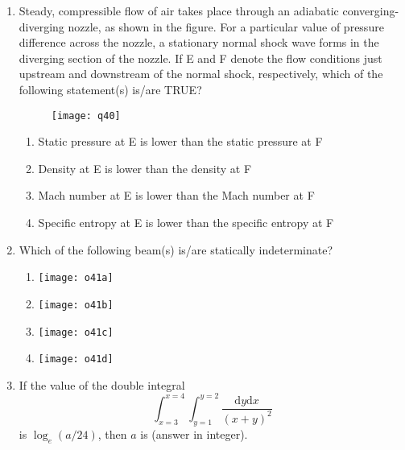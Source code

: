 \documentclass[journal,11pt,onecolumn]{IEEEtran}
\begin{document}
\begin{enumerate}[resume]
    \item Steady, compressible flow of air takes place through an adiabatic converging-diverging nozzle, as shown in the figure. For a particular value of pressure difference across the nozzle, a stationary normal shock wave forms in the diverging section of the nozzle. If E and F denote the flow conditions just upstream and downstream of the normal shock, respectively, which of the following statement(s) is/are TRUE?

          \begin{figure}[H]
              \centering
              \caption{}
              \texttt{[image: q40]}
              \label{fig:q40}
          \end{figure}

          \begin{enumerate}
              \item Static pressure at E is lower than the static pressure at F
              \item Density at E is lower than the density at F
              \item Mach number at E is lower than the Mach number at F
              \item Specific entropy at E is lower than the specific entropy at F
          \end{enumerate}

    \item Which of the following beam(s) is/are statically indeterminate?

          \begin{figure}[H]
              \centering
              \caption{}
              \label{fig:q41}
          \end{figure}

          \begin{enumerate}
              \item \texttt{[image: o41a]}
              \item \texttt{[image: o41b]}
              \item \texttt{[image: o41c]}
              \item \texttt{[image: o41d]}
          \end{enumerate}

    \item If the value of the double integral
          \[
              \int_{x=3}^{x=4} \int_{y=1}^{y=2} \frac{\mathrm{d}y\mathrm{d}x}{(x+y)^2}
          \] is $\log_e(a/24)$, then $a$ is \underline{\hspace{2cm}} (answer in integer).


\end{enumerate}
\end{document}
